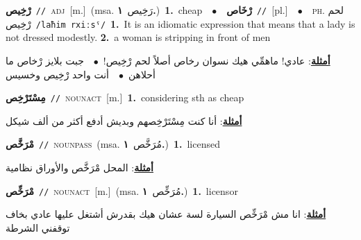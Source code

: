 \documentclass[10pt,a4paper,twoside]{article} %
\begin{document}
\begin{multicols}{2}
{\setlength\topsep{0pt}\textbf{\foreignlanguage{arabic}{رْخِيص}}\ {\color{gray}\texttt{//}\color{black}}\ \textsc{adj}\ [m.]\ \color{gray}(msa. \foreignlanguage{arabic}{رَخِيص}~\foreignlanguage{arabic}{\textbf{١.}})\color{black}\ \textbf{1.}~cheap\ \ $\bullet$\ \ \setlength\topsep{0pt}\textbf{\foreignlanguage{arabic}{رْخَاص}}\ {\color{gray}\texttt{//}\color{black}}\ [pl.]\ \ $\bullet$\ \ \textsc{ph.} \color{gray} \foreignlanguage{arabic}{لحم رْخِيص}\color{black}\ {\color{gray}\texttt{/{\sffamily laħim rxiːsˤ}/}\color{black}}\ \textbf{1.}~It is an idiomatic expression that means that a lady is not dressed modestly.  \textbf{2.}~a woman is stripping in front of men\  \begin{flushright}\color{gray}\foreignlanguage{arabic}{\textbf{\underline{\foreignlanguage{arabic}{أمثلة}}}: عادي! ماهمِّي هيك نسوان رخاص أصلاً لحم رْخِيص!\ $\bullet$\ \  جبت بلايز رْخاص ما أحلاهن\ $\bullet$\ \  أنت واحد رْخِيص وخسيس}\end{flushright}\color{black}} \vspace{2mm}

{\setlength\topsep{0pt}\textbf{\foreignlanguage{arabic}{مِسْتَرْخِص}}\ {\color{gray}\texttt{//}\color{black}}\ \textsc{noun\textunderscore act}\ [m.]\ \textbf{1.}~considering sth as cheap\  \begin{flushright}\color{gray}\foreignlanguage{arabic}{\textbf{\underline{\foreignlanguage{arabic}{أمثلة}}}: أنا كنت مِسْتَرْخِصهم وبديش أدفع أكثر من ألف شيكل}\end{flushright}\color{black}} \vspace{2mm}

{\setlength\topsep{0pt}\textbf{\foreignlanguage{arabic}{مْرَخَّص}}\ {\color{gray}\texttt{//}\color{black}}\ \textsc{noun\textunderscore pass}\ \color{gray}(msa. \foreignlanguage{arabic}{مُرَخَّص}~\foreignlanguage{arabic}{\textbf{١.}})\color{black}\ \textbf{1.}~licensed\  \begin{flushright}\color{gray}\foreignlanguage{arabic}{\textbf{\underline{\foreignlanguage{arabic}{أمثلة}}}: المحل مْرَخَّص والأوراق نظامية}\end{flushright}\color{black}} \vspace{2mm}

{\setlength\topsep{0pt}\textbf{\foreignlanguage{arabic}{مْرَخِّص}}\ {\color{gray}\texttt{//}\color{black}}\ \textsc{noun\textunderscore act}\ [m.]\ \color{gray}(msa. \foreignlanguage{arabic}{مُرَخِّص}~\foreignlanguage{arabic}{\textbf{١.}})\color{black}\ \textbf{1.}~licensor\  \begin{flushright}\color{gray}\foreignlanguage{arabic}{\textbf{\underline{\foreignlanguage{arabic}{أمثلة}}}: انا مش مْرَخِّص السيارة لسة عشان هيك بقدرش أشتغل عليها عادي بخاف توقفني الشرطة}\end{flushright}\color{black}} \vspace{2mm}


\end{multicols}
\end{document}
